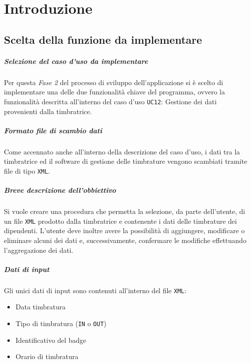 \chapter{Introduzione}
\section{Scelta della funzione da implementare}
\paragraph{Selezione del caso d'uso da implementare}
Per questa \textit{Fase 2} del processo di sviluppo dell'applicazione si è scelto di implementare una delle due funzionalità chiave del programma, ovvero la funzionalità descritta all'interno del caso d'uso \verb|UC12|: Gestione dei dati provenienti dalla timbratrice.

\paragraph{Formato file di scambio dati}
Come accennato anche all'interno della descrizione del caso d'uso, i dati tra la timbratrice ed il software di gestione delle timbrature vengono scambiati tramite file di tipo \verb|XML|.

\paragraph{Breve descrizione dell'obbiettivo}
Si vuole creare una procedura che permetta la selezione, da parte dell'utente, di un file \verb|XML| prodotto dalla timbratrice e contenente i dati delle timbrature dei dipendenti. L'utente deve inoltre avere la possibilità di aggiungere, modificare o eliminare alcuni dei dati e, successivamente, confermare le modifiche effettuando l'aggregazione dei dati.

\paragraph{Dati di input}
Gli unici dati di input sono contenuti all'interno del file \verb|XML|:
\begin{itemize}
	\item Data timbratura
	\item Tipo di timbratura (\verb|IN| o \verb|OUT|)
	\item Identificativo del badge
	\item Orario di timbratura
\end{itemize}

